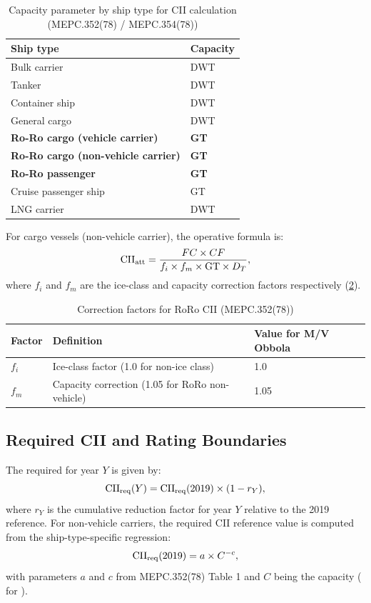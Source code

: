 \begin{table}[h]
\centering
\caption{Capacity parameter by ship type for CII calculation
         (MEPC.352(78) / MEPC.354(78))}
\label{tab:cii_capacity}
\begin{tabular}{ll}
  \toprule
  Ship type & Capacity \\
  \midrule
  Bulk carrier & DWT \\
  Tanker        & DWT \\
  Container ship & DWT \\
  General cargo  & DWT \\
  \textbf{Ro-Ro cargo (vehicle carrier)} & \textbf{GT} \\
  \textbf{Ro-Ro cargo (non-vehicle carrier)} & \textbf{GT} \\
  \textbf{Ro-Ro passenger} & \textbf{GT} \\
  Cruise passenger ship & GT \\
  LNG carrier  & DWT \\
  \bottomrule
\end{tabular}
\end{table}

For \RoRo{} cargo vessels (non-vehicle carrier), the operative formula is:
\begin{equation}
  \mathrm{CII}_{\mathrm{att}} = \frac{FC \times CF}{f_i \times f_m \times \mathrm{GT} \times D_T},
  \label{eq:cii_roro}
\end{equation}
where $f_i$ and $f_m$ are the ice-class and capacity correction factors
respectively (\cref{tab:cii_corrections}).

\begin{table}[h]
\centering
\caption{Correction factors for RoRo CII (MEPC.352(78))}
\label{tab:cii_corrections}
\begin{tabular}{lll}
  \toprule
  Factor & Definition & Value for M/V Obbola \\
  \midrule
  $f_i$ & Ice-class factor (1.0 for non-ice class) & 1.0 \\
  $f_m$ & Capacity correction (1.05 for RoRo non-vehicle) & 1.05 \\
  \bottomrule
\end{tabular}
\end{table}

\subsection{Required CII and Rating Boundaries}
\label{app:cii:required}

The required \CII{} for year $Y$ is given by:
\begin{equation}
  \mathrm{CII}_{\mathrm{req}}(Y) = \mathrm{CII}_{\mathrm{req}}(2019) \times (1 - r_Y),
  \label{eq:cii_required}
\end{equation}
where $r_Y$ is the cumulative reduction factor for year $Y$ relative to
the 2019 reference.  For \RoRo{} non-vehicle carriers, the required CII
reference value is computed from the ship-type-specific regression:
\begin{equation}
  \mathrm{CII}_{\mathrm{req}}(2019) = a \times C^{-c},
  \label{eq:cii_ref}
\end{equation}
with parameters $a$ and $c$ from MEPC.352(78) Table 1 and $C$ being the
capacity (\GT{} for \RoRo{}).

